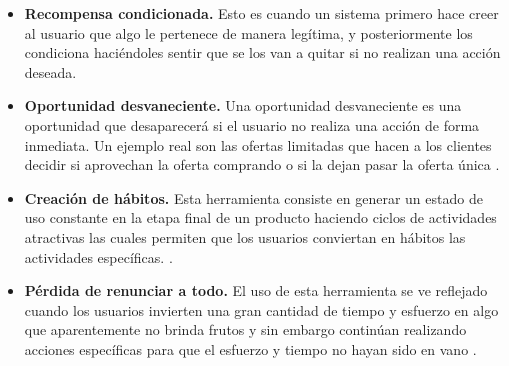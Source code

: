     \begin{itemize}
    \item
    {\bf Recompensa condicionada.}
        Esto es cuando un sistema primero hace creer al usuario que algo le pertenece de
        manera legítima, y posteriormente los condiciona haciéndoles sentir que se los
        van a quitar si no realizan una acción deseada.
        \cite[p. 330]{Octalysis}

    \item
    {\bf Oportunidad desvaneciente.}
        Una oportunidad desvaneciente es una oportunidad que desaparecerá si el usuario no
        realiza una acción de forma inmediata. Un ejemplo real son las ofertas limitadas
        que hacen a los clientes decidir si aprovechan la oferta comprando o si la dejan
        pasar la oferta única \cite[p. 333]{Octalysis}.

    \item
    {\bf Creación de hábitos.}
        Esta herramienta consiste en generar un estado de uso constante en la etapa final
        de un producto haciendo ciclos de actividades atractivas las cuales permiten que
        los usuarios conviertan en hábitos las actividades específicas.
        \cite[p. 334]{Octalysis}.

    \item
    {\bf Pérdida de renunciar a todo.}
        El uso de esta herramienta se ve reflejado cuando los usuarios invierten una gran
        cantidad de tiempo y esfuerzo en algo que aparentemente no brinda frutos y sin
        embargo continúan realizando acciones específicas para que el esfuerzo y tiempo
        no hayan sido en vano \cite[p. 338]{Octalysis}.

    \end{itemize}

\clearpage
